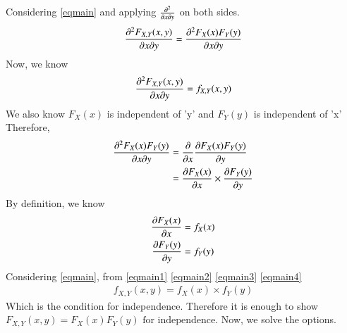 \documentclass[journal,12pt,twocolumn]{IEEEtran}
\begin{document}
Considering \eqref{eqmain} and applying $\pdv{ }{x}{y}$ on both sides.
\begin{align}
    \pdv{F_{X, Y}(x,y)}{x}{y} = \pdv{F_X(x) F_Y(y)}{x}{y}
\end{align}
Now, we know
\begin{align}
    \pdv{F_{X, Y}(x,y)}{x}{y} = f_{X, Y}(x,y)\label{eqmain1}
\end{align}
We also know $F_X(x)$ is independent of 'y' and $F_Y(y)$ is independent of 'x'
Therefore,
\begin{align}
    \pdv{F_X(x) F_Y(y)}{x}{y} &= \pdv{ }{x}  \pdv{F_X(x) F_Y(y)}{y}\\
    &= \pdv{F_X(x)}{x} \times \pdv{F_Y(y)}{y}\label{eqmain2}
\end{align}
By definition, we know
\begin{align}
    \pdv{F_X(x)}{x} &= f_X(x)\label{eqmain3}\\
    \pdv{F_Y(y)}{y} &= f_Y(y)\label{eqmain4}
\end{align}
Considering \eqref{eqmain}, from \eqref{eqmain1} \eqref{eqmain2} \eqref{eqmain3} \eqref{eqmain4} 
\begin{align}
    f_{X, Y}(x,y) = f_X(x) \times f_Y(y)
\end{align}
Which is the condition for independence. Therefore it is enough to show 
\begin{math}
    F_{X, Y}(x,y) = F_X(x)F_Y(y) \text{ for independence.}
\end{math}
Now, we solve the options.
\end{document}
